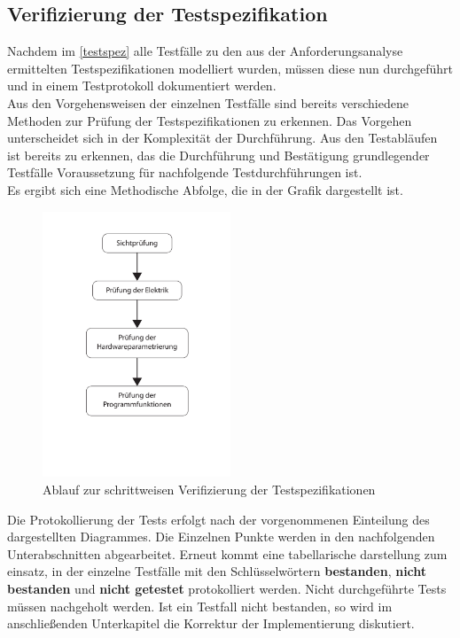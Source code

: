 \documentclass[../../../Bachelorarbeit.tex]{subfiles}
\begin{document}
\subsection{Verifizierung der Testspezifikation}
Nachdem im \autoref{testspez} alle Testfälle zu den aus der Anforderungsanalyse ermittelten Testspezifikationen modelliert wurden, müssen diese nun durchgeführt und in einem Testprotokoll dokumentiert werden.\\
Aus den Vorgehensweisen der einzelnen Testfälle sind bereits verschiedene Methoden zur Prüfung der Testspezifikationen zu erkennen. Das Vorgehen unterscheidet sich in der Komplexität der Durchführung. Aus den Testabläufen ist bereits zu erkennen, das die Durchführung und Bestätigung grundlegender Testfälle Voraussetzung für nachfolgende Testdurchführungen ist. \\
Es ergibt sich eine Methodische Abfolge, die in der Grafik dargestellt ist. %

\begin{figure}[H]
    \centering
    \includegraphics[width=0.5\textwidth]{Images/pruefablauf.pdf}
    \caption[Prüfablauf]{Ablauf zur schrittweisen Verifizierung der Testspezifikationen}
    \label{fig:my-img50}
\end{figure}

Die Protokollierung der Tests erfolgt nach der vorgenommenen Einteilung des dargestellten Diagrammes. Die Einzelnen Punkte werden in den nachfolgenden Unterabschnitten abgearbeitet. Erneut kommt eine tabellarische darstellung zum einsatz, in der einzelne Testfälle mit den Schlüsselwörtern \textbf{bestanden}, \textbf{nicht bestanden} und \textbf{nicht getestet} protokolliert werden. Nicht durchgeführte Tests müssen nachgeholt werden. Ist ein Testfall nicht bestanden, so wird im anschließenden Unterkapitel die Korrektur der Implementierung diskutiert.
\end{document}
